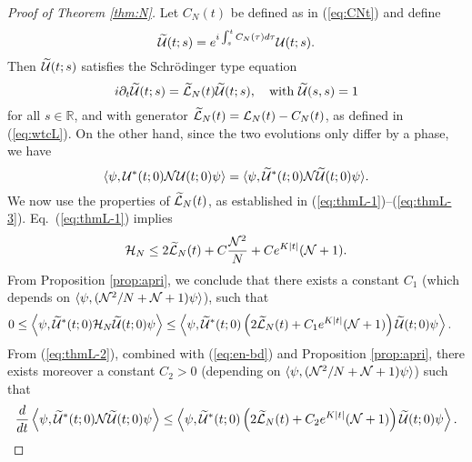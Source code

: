 \documentclass[11pt,a4paper]{article}
\newcommand{\ech}[2]{#2}	%
\newcommand{\cU}{{\cal U}}
\newcommand{\bR}{{\mathbb R}}
\newcommand{\wt}{\widetilde}
\newcommand{\cH}{{\cal H}}
\newcommand{\cL}{{\cal L}}
\newcommand{\cN}{{\cal N}}
\begin{document}
\begin{proof}[Proof of Theorem \ref{thm:N}]
Let $C_N (t)$ be defined as in (\ref{eq:CNt}) and define
\[ \wt{\cU} (t;s) = e^{i \int_s^t C_N (\tau) d\tau} \cU (t;s). \]
Then $\wt{\cU} (t;s)$ satisfies the Schr\"odinger type equation
\[ i\partial_t \wt{\cU} (t;s) = \wt{\cL}_N (t) \wt{\cU} (t;s), \quad \text{with } \wt{\cU} (s,s) = 1 \]
for all $s \in \bR$, and with generator $\wt{\cL}_N (t) = \cL_N (t) - C_N (t)$, as defined in (\ref{eq:wtcL}). On the other hand, since the two evolutions only differ by a phase, we have
\[ \langle \psi , \cU^* (t;0) \cN \cU (t;0) \psi \rangle = \langle \psi , \wt{\cU}^* (t;0) \cN \wt{\cU} (t;0) \psi \rangle. \]
We now use the properties of $\wt{\cL}_N(t)$, as established in (\ref{eq:thmL-1})--(\ref{eq:thmL-3}).\ech{To this end, we observe that, by the assumption $\varphi \in H^4 (\bR^3)$ and by Proposition \ref{t:pdes}, there exist constants $C,K > 0$ such that \begin{equation}\label{eq:varphi-bds}  \| \varphi_t^{(N)} \|_{H^4}^2 , \left(\| \varphi_t^{(N)} \|_{H^4} \| \varphi_t^{(N)} \|_{H^2} + \| \varphi_t^{(N)} \|_{H^2}^3 \right) \leq C e^{K |t|} \end{equation}
uniformly in $N$, and for all $t \in \bR$.}{} Eq.\ (\ref{eq:thmL-1}) implies \ech{therefore}{} 
\begin{equation}\label{eq:en-bd} \cH_N \leq 2 \wt{\cL}_N (t) + C \frac{\cN^2}{N} + C e^{K |t|} (\cN + 1). \end{equation}
From Proposition \ref{prop:apri}, we conclude that there exists a constant $C_1$ (which depends on $\langle \psi , (\cN^2/ N + \cN + 1) \psi \rangle$\ech{and on the constant $C$ in (\ref{eq:varphi-bds})}{}), such that
\begin{equation}\label{eq:grw-1} \begin{split} 
0 \leq \Big\langle \psi , \wt{\cU}^* (t;0) &\cH_N \wt{\cU} (t;0) \psi \Big\rangle \leq \left\langle \psi , \wt{\cU}^* (t;0) \left( 2 \wt{\cL}_N (t) + C_1 e^{K|t|} (\cN + 1) \right) \wt{\cU} (t;0) \psi \right\rangle. \end{split} \end{equation}
From (\ref{eq:thmL-2}), combined with (\ref{eq:en-bd}) and Proposition \ref{prop:apri}, there exists moreover a constant $C_2 > 0$ (depending on $\langle \psi , (\cN^2/ N + \cN + 1) \psi \rangle$\ech{ and on the constant $C$ in (\ref{eq:varphi-bds})}{}) such that
\[  
\frac{d}{dt} \left\langle \psi, \wt{\cU}^* (t;0) \cN \wt{\cU} (t;0) \psi \right\rangle  \leq  \left\langle \psi , \wt{\cU}^* (t;0)  \left(2 \wt{\cL}_N (t) +C_2 e^{K|t|} (\cN + 1) \right)  \wt{\cU} (t;0) \psi \right\rangle.
\]
\end{proof}
\end{document}

